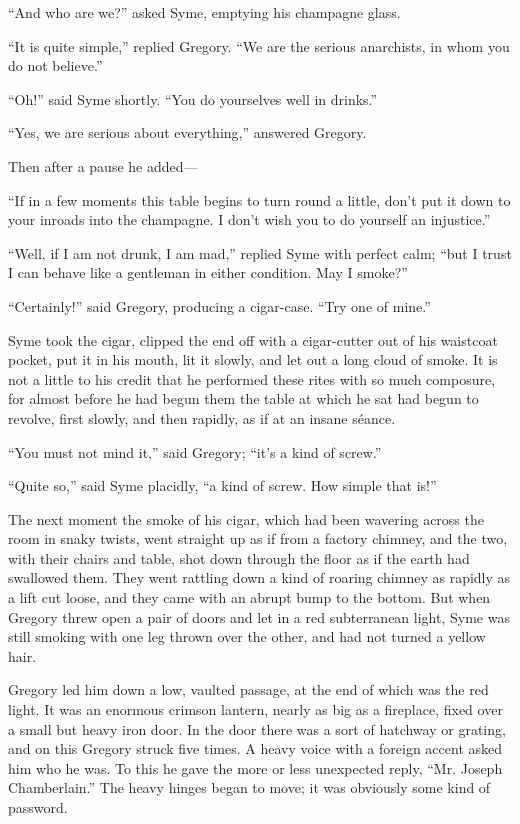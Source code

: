 “And who are we?” asked Syme, emptying his champagne glass.

“It is quite simple,” replied Gregory. “We are the serious anarchists, in whom you do not believe.”

“Oh!” said Syme shortly. “You do yourselves well in drinks.”

“Yes, we are serious about everything,” answered Gregory.

Then after a pause he added⁠—

“If in a few moments this table begins to turn round a little, don’t put it down to your inroads into the champagne. I don’t wish you to do yourself an injustice.”

“Well, if I am not drunk, I am mad,” replied Syme with perfect calm; “but I trust I can behave like a gentleman in either condition. May I smoke?”

“Certainly!” said Gregory, producing a cigar-case. “Try one of mine.”

Syme took the cigar, clipped the end off with a cigar-cutter out of his waistcoat pocket, put it in his mouth, lit it slowly, and let out a long cloud of smoke. It is not a little to his credit that he performed these rites with so much composure, for almost before he had begun them the table at which he sat had begun to revolve, first slowly, and then rapidly, as if at an insane séance.

“You must not mind it,” said Gregory; “it’s a kind of screw.”

“Quite so,” said Syme placidly, “a kind of screw. How simple that is!”

The next moment the smoke of his cigar, which had been wavering across the room in snaky twists, went straight up as if from a factory chimney, and the two, with their chairs and table, shot down through the floor as if the earth had swallowed them. They went rattling down a kind of roaring chimney as rapidly as a lift cut loose, and they came with an abrupt bump to the bottom. But when Gregory threw open a pair of doors and let in a red subterranean light, Syme was still smoking with one leg thrown over the other, and had not turned a yellow hair.

Gregory led him down a low, vaulted passage, at the end of which was the red light. It was an enormous crimson lantern, nearly as big as a fireplace, fixed over a small but heavy iron door. In the door there was a sort of hatchway or grating, and on this Gregory struck five times. A heavy voice with a foreign accent asked him who he was. To this he gave the more or less unexpected reply, “Mr. Joseph Chamberlain.” The heavy hinges began to move; it was obviously some kind of password.

